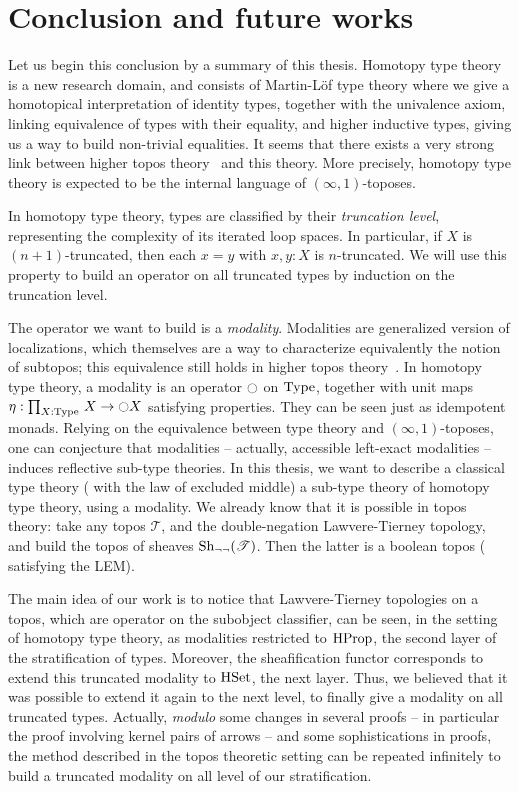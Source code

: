 \chapter{Conclusion and future works}
\label{chap:conclusion}

Let us begin this conclusion by a summary of this thesis. Homotopy
type theory is a new research domain, and consists of Martin-Löf type
theory where we give a homotopical interpretation of identity types,
together with the univalence axiom, linking equivalence of types with
their equality, and higher inductive types, giving us a way to build
non-trivial equalities. 
It seems that there exists a very strong link between higher topos
theory~\cite{lurie} and this theory. More precisely, homotopy type
theory is expected to be the internal language of
$(\infty,1)$-toposes.

In homotopy type theory, types are classified
by their {\em truncation level}, representing the complexity of its
iterated loop spaces. In particular, if $X$ is $(n+1)$-truncated, then
each $x = y$ with $x,y:X$ is $n$-truncated. We will use this property
to build an operator on all truncated types by induction on the
truncation level.

The operator we want to build is a {\em modality}. Modalities are
generalized version of localizations, which themselves are a way to
characterize equivalently the notion of subtopos; this equivalence
still holds in higher topos theory~\cite[Section 6.2.2]{lurie}. In
homotopy type theory, a modality is an operator $\ocircle$ on $\operatorname{Type}$,
together with unit maps $\eta : \prod_{X:\operatorname{Type}}\, X \to \ocircle X$
satisfying properties. They can be seen just as idempotent monads.
Relying on the equivalence between type theory and
$(\infty,1)$-toposes, one can conjecture that modalities -- actually,
accessible left-exact modalities -- induces reflective sub-type
theories. In this thesis, we want to describe a classical type theory
(\ie{} with the law of excluded middle) a sub-type theory of homotopy
type theory, using a modality.
We already know that it is possible in topos theory: take any topos
$\mathcal T$, and the double-negation Lawvere-Tierney topology, and
build the topos of sheaves $\mathrm{Sh}_{\lnot\lnot}(\mathcal T)$. Then the
latter is a boolean topos (\ie{} satisfying the LEM).

The main idea of our work is to notice that Lawvere-Tierney topologies
on a topos, which are operator on the subobject classifier, can be
seen, in the setting of homotopy type theory, as modalities restricted
to $\operatorname{HProp}$, the second layer of the stratification of
types. Moreover, the sheafification functor corresponds to extend this
truncated modality to $\operatorname{HSet}$, the next layer. Thus, we believed that
it was possible to extend it again to the next level, \etc{} to
finally give a modality on all truncated types. Actually, {\em modulo}
some changes in several proofs -- in particular the proof involving
kernel pairs of arrows -- and some sophistications in proofs, the
method described in the topos theoretic setting can be repeated
infinitely to build a truncated modality on all level of our
stratification.

